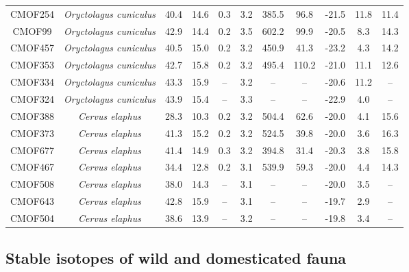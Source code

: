 \documentclass[preprint, 3p, authoryear]{elsarticle} %
\begin{document}
\begin{longtable}[t]{c>{}cccccccccc}
CMOF254 & \em{Oryctolagus cuniculus} & 40.4 & 14.6 & 0.3 & 3.2 & 385.5 & 96.8 & -21.5 & 11.8 & 11.4\\
CMOF99 & \em{Oryctolagus cuniculus} & 42.9 & 14.4 & 0.2 & 3.5 & 602.2 & 99.9 & -20.5 & 8.3 & 14.3\\
CMOF457 & \em{Oryctolagus cuniculus} & 40.5 & 15.0 & 0.2 & 3.2 & 450.9 & 41.3 & -23.2 & 4.3 & 14.2\\
CMOF353 & \em{Oryctolagus cuniculus} & 42.7 & 15.8 & 0.2 & 3.2 & 495.4 & 110.2 & -21.0 & 11.1 & 12.6\\
CMOF334 & \em{Oryctolagus cuniculus} & 43.3 & 15.9 & -- & 3.2 & -- & -- & -20.6 & 11.2 & --\\
CMOF324 & \em{Oryctolagus cuniculus} & 43.9 & 15.4 & -- & 3.3 & -- & -- & -22.9 & 4.0 & --\\
CMOF388 & \em{Cervus elaphus} & 28.3 & 10.3 & 0.2 & 3.2 & 504.4 & 62.6 & -20.0 & 4.1 & 15.6\\
CMOF373 & \em{Cervus elaphus} & 41.3 & 15.2 & 0.2 & 3.2 & 524.5 & 39.8 & -20.0 & 3.6 & 16.3\\
CMOF677 & \em{Cervus elaphus} & 41.4 & 14.9 & 0.3 & 3.2 & 394.8 & 31.4 & -20.3 & 3.8 & 15.8\\
CMOF467 & \em{Cervus elaphus} & 34.4 & 12.8 & 0.2 & 3.1 & 539.9 & 59.3 & -20.0 & 4.4 & 14.3\\
CMOF508 & \em{Cervus elaphus} & 38.0 & 14.3 & -- & 3.1 & -- & -- & -20.0 & 3.5 & --\\
CMOF643 & \em{Cervus elaphus} & 42.8 & 15.9 & -- & 3.1 & -- & -- & -19.7 & 2.9 & --\\
CMOF504 & \em{Cervus elaphus} & 38.6 & 13.9 & -- & 3.2 & -- & -- & -19.8 & 3.4 & --\\*
\end{longtable}
\endgroup{}

\hypertarget{stable-isotopes-of-wild-and-domesticated-fauna}{%
\subsection{Stable isotopes of wild and domesticated fauna}\label{stable-isotopes-of-wild-and-domesticated-fauna}}
\end{document}
